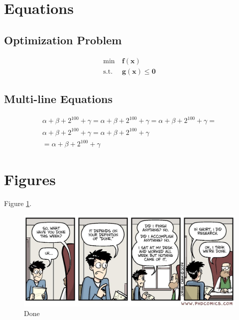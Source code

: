 \documentclass[letterpaper, 12pt, oneside]{book}
\theoremstyle{plain}
\theoremstyle{definition}
\theoremstyle{remark}
\begin{document}
\section{Equations} %
\label{sec:equations}
\subsection{Optimization Problem} %
\label{sub:optimization_problem}
\begin{subequations}
\begin{align}
\min~& \bm{f}(\bm{x}) \\
\text{s.t.}~& \bm{g}(\bm{x}) \le \bm{0}
\end{align}
\end{subequations}

\subsection{Multi-line Equations} %
\label{sub:multi_line_equations}
\begin{multline}
\alpha+\beta+2^{100} + \gamma = \alpha+\beta+2^{100} + \gamma = \alpha+\beta+2^{100} + \gamma = \\
\alpha+\beta+2^{100} + \gamma = \alpha+\beta+2^{100} + \gamma \\
= \alpha+\beta+2^{100} + \gamma 
\end{multline}



\section{Figures} %
\label{sec:figures}
Figure \ref{fig:done}.

\begin{figure}[htbp]
  \centering
  \includegraphics[width=\linewidth]{done.jpg}
  \caption{Done}
  \label{fig:done}
\end{figure}
\end{document}
